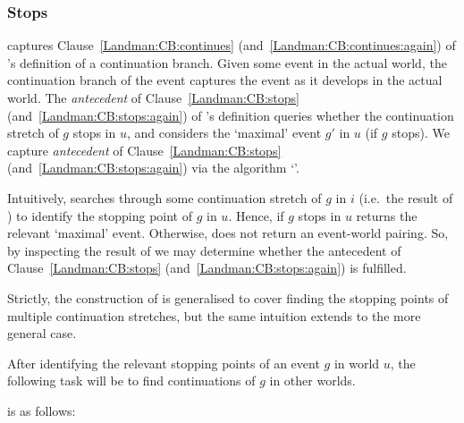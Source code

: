 \subsubsection{Stops}
\label{cha:fcs:sec:Prog:L:Alg:stops}

\begin{note}[\AlgGetStops{}]
  \AlgAC{} captures Clause~\ref{Landman:CB:continues} (and~\ref{Landman:CB:continues:again}) of \citeauthor{Landman:1992wh}'s definition of a continuation branch.
  Given some event in the actual world, the continuation branch of the event captures the event as it develops in the actual world.
  The \emph{antecedent} of Clause~\ref{Landman:CB:stops} (and~\ref{Landman:CB:stops:again}) of \citeauthor{Landman:1992wh}'s definition queries whether the continuation stretch of \(g\) stops in \(u\), and considers the `maximal' event \(g'\) in \(u\) (if \(g\) stops).
  We capture \emph{antecedent} of Clause~\ref{Landman:CB:stops} (and~\ref{Landman:CB:stops:again}) via the algorithm `\AlgGetStops{}'.

  Intuitively, \AlgGetStops{} searches through some continuation stretch of \(g\) in \(i\) (i.e.\ the result of ) to identify the stopping point of \(g\) in \(u\).
  Hence, if \(g\) stops in \(u\) \AlgGetStops{} returns the relevant `maximal' event.
  Otherwise, \AlgGetStops{} does not return an event-world pairing.
  So, by inspecting the result of \AlgGetStops{} we may determine whether the antecedent of Clause~\ref{Landman:CB:stops} (and~\ref{Landman:CB:stops:again}) is fulfilled.

  Strictly, the construction of \AlgGetStops{} is generalised to cover finding the stopping points of multiple continuation stretches, but the same intuition extends to the more general case.

  After identifying the relevant stopping points of an event \(g\) in world \(u\), the following task will be to find continuations of \(g\) in other worlds.

  \AlgGetStops{} is as follows:

  \begin{algorithm}[H]
    \label{PrAl:g-s}
    \caption{\AlgGetStops{}}
    \SetAlgoLined
    \DontPrintSemicolon
  \end{algorithm}
\end{note}

